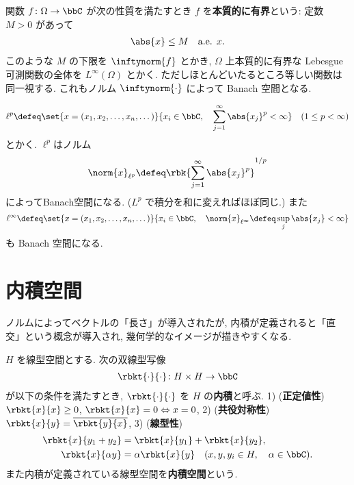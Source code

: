 \documentclass[openany, a4paper, oneside]{jsbook}
\begin{document}
\begin{defn}
関数 $f \colon \Omega \to \bbC$ が次の性質を満たすとき $f$ を\textbf{本質的に有界}という:
定数 $M > 0$ があって
\begin{align}
 \abs{x}
 \leq
 M \quad \text{a.e. } x.
\end{align}
このような $M$ の下限を $\inftynorm{f}$ とかき,
$\Omega$ 上本質的に有界な Lebesgue 可測関数の全体を $L^{\infty}(\Omega)$ とかく.
ただしほとんどいたるところ等しい関数は同一視する.
これもノルム  $\inftynorm{\cdot}$ によって Banach 空間となる.
\end{defn}

\begin{ex}[$\ell^p$ 空間]
\begin{align}
 \ell^p
 \defeq
 \set{x = (x_1, x_2, \dots, x_n, \dots)}{x_i \in \bbC, \quad \sum_{j=1}^{\infty} \abs{x_j}^p < \infty}
 \quad (1 \le p < \infty)
\end{align}
とかく.
$\ell^p$はノルム
\begin{align}
 \norm{x}_{\ell^p}
 \defeq
 \rbk{\sum_{j=1}^{\infty} \abs{x_j}^p}^{1/p}
\end{align}
によってBanach空間になる.
($L^p$ で積分を和に変えればほぼ同じ.)
また
\begin{align}
 \ell^{\infty}
 \defeq
 \set{x = (x_1, x_2, \dots, x_n, \dots)}{x_i \in \bbC, \quad \norm{x}_{\ell^{\infty}} \defeq \sup_j \abs{x_j} < \infty}
\end{align}
も Banach 空間になる.
\end{ex}
\section{内積空間}

ノルムによってベクトルの「長さ」が導入されたが,
内積が定義されると「直交」という概念が導入され,
幾何学的なイメージが描きやすくなる.

\begin{defn}[内積空間]
 $H$ を線型空間とする.
 次の双線型写像
 \begin{align}
  \rbkt{\cdot}{\cdot} \colon H \times H \to \bbC
 \end{align}
 が以下の条件を満たすとき, $\rbkt{\cdot}{\cdot}$ を $H$ の\textbf{内積}と呼ぶ.
 1) (\textbf{正定値性}) $\rbkt{x}{x} \ge 0$, $\rbkt{x}{x} = 0 \Leftrightarrow x=0$,
 2) (\textbf{共役対称性}) $\rbkt{x}{y} = \overline{\rbkt{y}{x}}$,
 3) (\textbf{線型性})
    \begin{align}
     \rbkt{x}{y_1 + y_2}
     &=
      \rbkt{x}{y_1} + \rbkt{x}{y_2}, \\
     \rbkt{x}{\alpha y}
     &=
     \alpha \rbkt{x}{y} \quad (x, y, y_i \in H, \quad \alpha \in \bbC).
    \end{align}
 また内積が定義されている線型空間を\textbf{内積空間}という.
\end{defn}
\end{document}
